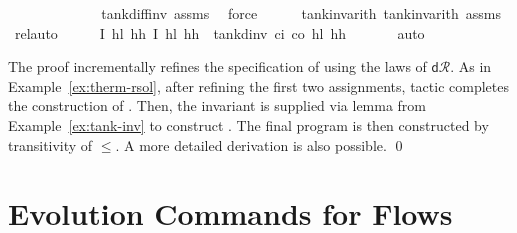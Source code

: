 \documentclass[envcountsame,envcountsect]{llncs}
\newcommand{\dR}{\mathsf{d}\mathcal{R}}
\begin{document}
\begin{example}
\begin{isabellebody}
\ \ \ \ \ \ \ \ \ \isamarkupfalse%
\ {}\ \isamarkupfalse%
\ tank{\isacharunderscore}diff{\isacharunderscore}inv\ assms\ \isamarkupfalse%
\ force{\isacharplus}\isanewline
\ \ \ \ \isamarkupfalse%
\ tank{\isacharunderscore}inv{\isacharunderscore}arith{}\ tank{\isacharunderscore}inv{\isacharunderscore}arith{}\ assms\ \isamarkupfalse%
\ rel{\isacharunderscore}auto{\isacharprime}\isanewline
\ \ \isamarkupfalse%
\ \isamarkupfalse%
\ {\isachardoublequoteopen}\isactrlbold {\isacharbrackleft}I\ h\isactrlsub l\ h\isactrlsub h{\isacharcomma}\ I\ h\isactrlsub l\ h\isactrlsub h\isactrlbold {\isacharbrackright}\ {\isasymge}\ tank{\isacharunderscore}dinv\ c\isactrlsub i\ c\isactrlsub o\ h\isactrlsub l\ h\isactrlsub h\ {\isasymtau}{\isachardoublequoteclose}\isanewline
\ \ \ \ \isamarkupfalse%
\ auto\isanewline
{}\isamarkupfalse%
\isanewline
\end{isabellebody}

\noindent The proof incrementally refines the specification of
 using the laws of $\dR$. As in
Example~\ref{ex:therm-rsol}, after refining the first two assignments,
tactic  completes the construction of
. Then, the invariant is supplied via lemma
 from
Example~\ref{ex:tank-inv} to construct . The final program is then
constructed by transitivity of $\leq$. A more detailed derivation
is also possible.
\qed
\end{example}


\section{Evolution Commands for Flows}\label{sec:from-flows}
\end{document}
